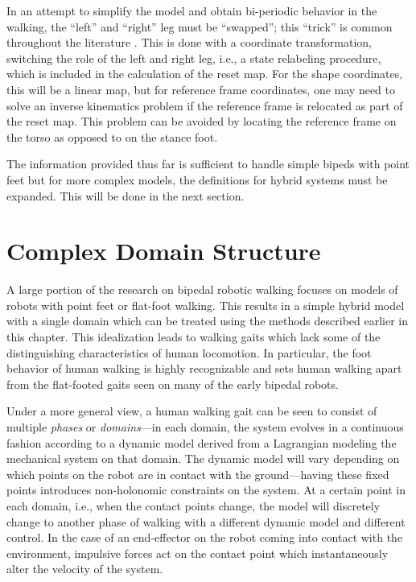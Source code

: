 In an attempt to simplify the model and obtain bi-periodic behavior in the
walking, the ``left'' and ``right'' leg must be ``swapped'';
%
this ``trick'' is common throughout the literature \cite{Grizzle2001}.
%
This is done with a coordinate transformation, switching the role of the left
and right leg, i.e., a state relabeling procedure, which is included in the
calculation of the reset map.
%
For the shape coordinates, this will be a linear map, but for reference frame
coordinates, one may need to solve an inverse kinematics problem if the
reference frame is relocated as part of the reset map.
%
This problem can be avoided by locating the reference frame on the torso as
opposed to on the stance foot.

The information provided thus far is sufficient to handle simple bipeds with
point feet but for more complex models, the definitions for hybrid systems must
be expanded.
%
This will be done in the next section.


\section{Complex Domain Structure} \label{sec:complex-models}

%
A large portion of the research on bipedal robotic walking focuses on models of
robots with point feet or flat-foot walking.
%
This results in a simple hybrid model with a single domain which can be treated
using the methods described earlier in this chapter.
%
This idealization leads to walking gaits which lack some of the distinguishing
characteristics of human locomotion.
%
In particular, the foot behavior of human walking is highly recognizable and
sets human walking apart from the flat-footed gaits seen on many of the early
bipedal robots.

Under a more general view, a human walking gait can be seen to consist of
multiple {\em phases} or {\em domains}---in each domain, the system evolves in a
continuous fashion according to a dynamic model derived from a Lagrangian
modeling the mechanical system on that domain.
%
The dynamic model will vary depending on which points on the robot are in
contact with the ground---having these fixed points introduces non-holonomic
constraints on the system.
%
At a certain point in each domain, i.e., when the contact points change, the
model will discretely change to another phase of walking with a different
dynamic model and different control.
%
In the case of an end-effector on the robot coming into contact with the
environment, impulsive forces act on the contact point which instantaneously
alter the velocity of the system.
%

